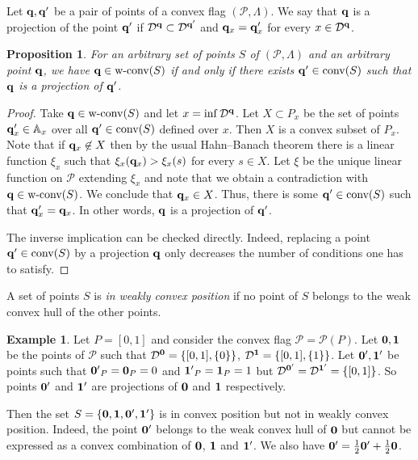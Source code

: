 \documentclass{daj}
\newcommand{\Q}{\mathbb Q}
\newcommand{\Z}{\mathbb Z}
\newcommand{\A}{\mathbb A}
\newcommand{\D}{\mathcal D}
\renewcommand{\P}{\mathcal P}
\newcommand{\wc}{\mbox{\rm w-conv}}
\renewcommand{\c}{\mbox{\rm conv}}
\newtheorem{prop}[theorem]{Proposition}
\theoremstyle{definition}
\theoremstyle{remark}
\theoremstyle{definition}
\newtheorem{example}[theorem]{Example}
\theoremstyle{definition}
\begin{document}
Let ${\bf q}, {\bf q}'$ be a pair of points of a convex flag $(\P, \Lambda)$. We say that ${\bf q}$ is a projection of the point ${\bf q}'$ if $\D^{\bf q} \subset \D^{{\bf q}'}$ and ${\bf q}_x = {\bf q}'_x$ for every $x \in \D^{\bf q}$.

\begin{prop}\label{pf1}
For an arbitrary set of points $S$ of $(\P, \Lambda)$ and an arbitrary point ${\bf q}$,
we have ${\bf q} \in \wc(S)$ if and only if there exists ${\bf q}' \in \c(S)$ such that ${\bf q}$ is a projection of ${\bf q}'$.
\end{prop}

\begin{proof}
Take ${\bf q} \in \wc(S)$ and let $x = \inf \D^{\bf q}$. Let $X \subset P_x$ be the set of points ${\bf q}'_x \in \A_x$ over all ${\bf q}' \in \c(S)$ defined over $x$. Then $X$ is a convex subset of $P_x$. Note that if ${\bf q}_x \not \in X$ then by the usual Hahn--Banach theorem there is a linear function $\xi_x$ such that $\xi_x({\bf q}_x) > \xi_x(s)$ for every $s \in X$. Let $\xi$ be the unique linear function on $\P$ extending $\xi_x$ and note that we obtain a contradiction with ${\bf q} \in \wc(S)$. We conclude that ${\bf q}_x \in X$. Thus, there is some ${\bf q}' \in \c(S)$ such that ${\bf q}'_x = {\bf q}_x$. In other words, ${\bf q}$ is a projection of ${\bf q}'$.

The inverse implication can be checked directly. Indeed, replacing a point ${\bf q}' \in \c(S)$ by a projection ${\bf q}$ only decreases the number of conditions one has to satisfy.
\end{proof}

A set of points $S$ is {\it in weakly convex position} if no point of $S$ belongs to the weak convex hull of the other points. 


\begin{example}
    Let $P = [0, 1]$ and consider the convex flag $\P = \P(P)$. Let ${\bf 0}, {\bf 1}$ be the points of $\P$ such that $\D^{\bf 0} = \{[0, 1], \{0\}\}$, $\D^{\bf 1} = \{[0, 1], \{1\}\}$. Let ${\bf 0'}, {\bf 1'}$ be points such that ${\bf 0'}_P = {\bf 0}_P = 0$ and ${\bf 1'}_P = {\bf 1}_P = 1$ but $
    \D^{\bf 0'} = \D^{\bf 1'} = \{[0, 1]\}$. 
    So points ${\bf 0'}$ and ${\bf 1'}$ are projections of ${\bf 0}$ and ${\bf 1}$ respectively.

    Then the set $S = \{{\bf 0}, {\bf 1}, {\bf 0'}, {\bf 1'}\}$ is in convex position but not in weakly convex position. Indeed, the point ${\bf 0'}$ belongs to the weak convex hull of ${\bf 0}$ but cannot be expressed as a convex combination of ${\bf 0}$, ${\bf 1}$ and ${\bf 1'}$. We also have ${\bf 0'} = \frac{1}{2} {\bf 0'} + \frac{1}{2}{\bf 0}$. 
\end{example}
\end{document}
